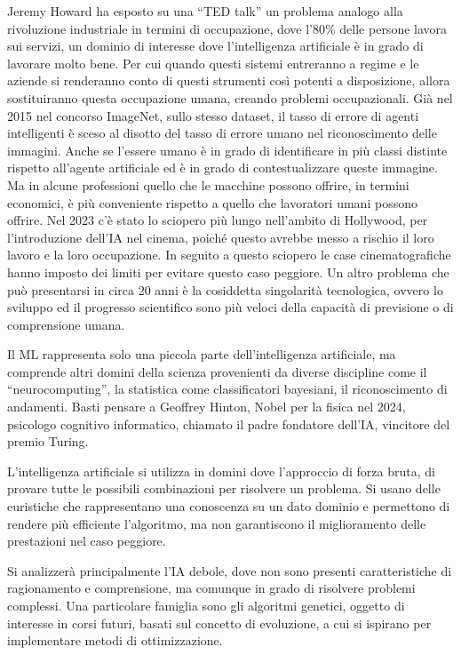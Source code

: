 \documentclass{article}
\numberwithin{equation}{subsection}
\begin{document}
Jeremy Howard ha esposto su una ``TED talk'' un problema analogo alla rivoluzione industriale in 
termini di occupazione, dove l'80\% delle persone lavora sui servizi, un dominio di interesse dove 
l'intelligenza artificiale è in grado di lavorare molto bene. Per cui quando questi sistemi entreranno 
a regime e le aziende si renderanno conto di questi strumenti così potenti a disposizione, allora 
sostituiranno questa occupazione umana, creando problemi occupazionali. 
Già nel 2015 nel concorso ImageNet, sullo stesso dataset, il tasso di errore di agenti intelligenti è sceso 
al disotto del tasso di errore umano nel riconoscimento delle immagini. Anche se l'essere umano è in grado 
di identificare in più classi distinte rispetto all'agente artificiale ed è in grado di contestualizzare 
queste immagine. 
Ma in alcune professioni quello che le macchine possono offrire, in termini economici, è più conveniente 
rispetto a quello che lavoratori umani possono offrire. 
Nel 2023 c'è stato lo sciopero più lungo nell'ambito di Hollywood, per l'introduzione dell'IA nel cinema, 
poiché questo avrebbe messo a rischio il loro lavoro e la loro occupazione. In seguito a questo sciopero 
le case cinematografiche hanno imposto dei limiti per evitare questo caso peggiore.  
Un altro problema che può presentarsi in circa 20 anni è la cosiddetta singolarità tecnologica, ovvero lo sviluppo ed il progresso scientifico sono più veloci della capacità di previsione o di comprensione umana. 


Il ML rappresenta solo una piccola parte dell'intelligenza artificiale, ma comprende altri domini della scienza provenienti da diverse discipline 
come il ``neurocomputing'', la statistica come classificatori bayesiani, il riconoscimento di andamenti. 
Basti pensare a Geoffrey Hinton, Nobel per la fisica nel 2024, psicologo cognitivo informatico, chiamato il padre fondatore dell'IA, vincitore del premio Turing. 



L'intelligenza artificiale si utilizza in domini dove l'approccio di forza bruta, di provare tutte le possibili combinazioni per risolvere un problema. Si usano delle 
euristiche che rappresentano una conoscenza su un dato dominio e permettono di rendere più efficiente l'algoritmo, ma non garantiscono il miglioramento delle prestazioni 
nel caso peggiore. 

Si analizzerà principalmente l'IA debole, dove non sono presenti caratteristiche di ragionamento e comprensione, ma comunque in grado di risolvere problemi complessi. 
Una particolare famiglia sono gli algoritmi genetici, oggetto di interesse in corsi futuri, basati sul concetto di evoluzione, a cui si ispirano per implementare 
metodi di ottimizzazione. 
\end{document}
